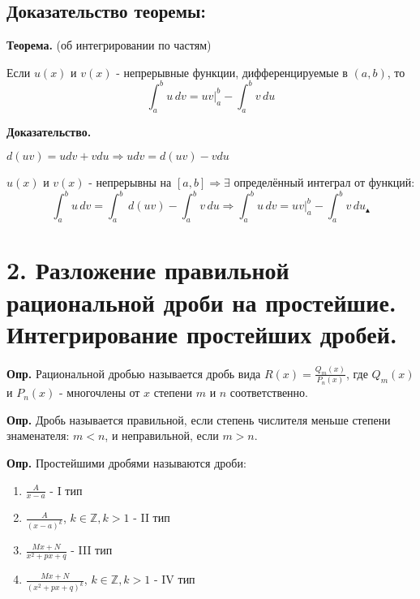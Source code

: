 \documentclass[11pt]{article}
\begin{document}
\subsection*{Доказательство теоремы:}
\par\textbf{Теорема.} (об интегрировании по частям)
\par Если $u(x)$ и $v(x)$ - непрерывные функции, дифференцируемые в $(a, b)$, то $$\int_{a}^b u \, dv = uv\vert_{a}^b - \int_{a}^b v \, du$$
\par\textbf{Доказательство.}
\par $d(uv) = udv + vdu \Rightarrow udv = d(uv) - vdu$
\par $u(x)$ и $v(x)$ - непрерывны на $[a, b] \Rightarrow \exists$ определённый интеграл от функций: $$\int_{a}^b u \, dv = \int_{a}^b \, d(uv) - \int_{a}^b v\, du \Rightarrow \int_{a}^b u\, dv = uv \vert_{a}^b - \int_{a}^b v \, du _{\blacktriangle}$$


\section*{2. Разложение правильной рациональной дроби на простейшие. Интегрирование простейших дробей.}
\textbf{Опр.} Рациональной дробью называется дробь вида \(R(x) = \frac{Q_{m}(x)}{P_{n}(x)}\), где \(Q_{m}(x)\) и \(P_{n}(x)\) - многочлены от \(x\) степени \(m\) и \(n\) соответственно.\par
\textbf{Опр.} Дробь называется правильной, если степень числителя меньше степени знаменателя: \(m < n\), и неправильной, если \(m > n\).\par
\textbf{Опр.} Простейшими дробями называются дроби:
\begin{enumerate}
\item {\Large \(\frac{A}{x-a}\)} - I тип
\item {\Large \(\frac{A}{(x-a)^k}\)}, \(k \in \mathbb{Z} , k > 1\) - II тип
\item {\Large \(\frac{Mx + N}{x^2 + px + q}\)} - III тип
\item {\Large \(\frac{Mx + N}{(x^2 + px + q)^k}\)}, \(k \in \mathbb{Z}, k > 1\) - IV тип
\end{enumerate}
\end{document}
